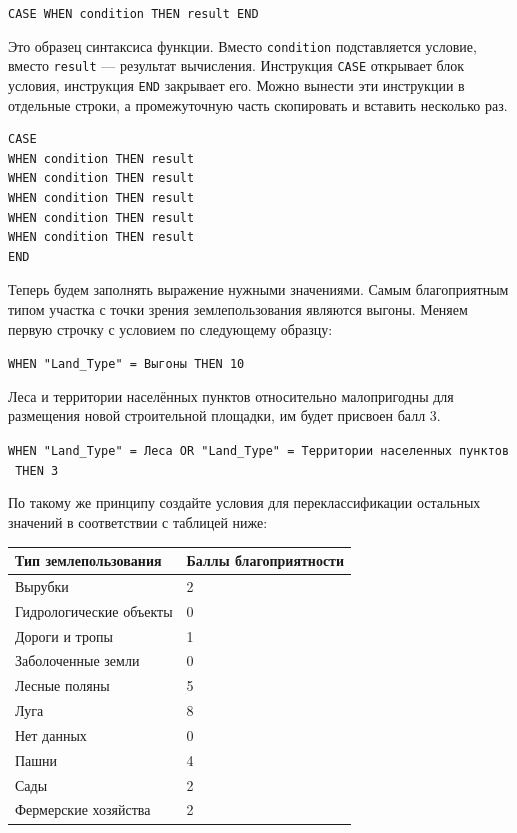 \documentclass[
  12pt,
]{book}
\begin{document}
\begin{enumerate}
  \texttt{CASE\ WHEN\ condition\ THEN\ result\ END}

  Это образец синтаксиса функции. Вместо \texttt{condition} подставляется условие, вместо \texttt{result} --- результат вычисления. Инструкция \texttt{CASE} открывает блок условия, инструкция \texttt{END} закрывает его. Можно вынести эти инструкции в отдельные строки, а промежуточную часть скопировать и вставить несколько раз.

\begin{verbatim}
CASE 
WHEN condition THEN result 
WHEN condition THEN result 
WHEN condition THEN result 
WHEN condition THEN result 
WHEN condition THEN result 
END
\end{verbatim}

  Теперь будем заполнять выражение нужными значениями. Самым благоприятным типом участка с точки зрения землепользования являются выгоны. Меняем первую строчку с условием по следующему образцу:

  \texttt{WHEN\ "Land\_Type"\ =\ \textquotesingle{}Выгоны\textquotesingle{}\ THEN\ 10}

  Леса и территории населённых пунктов относительно малопригодны для размещения новой строительной площадки, им будет присвоен балл 3.

  \texttt{WHEN\ "Land\_Type"\ =\ \textquotesingle{}Леса\textquotesingle{}\ OR\ "Land\_Type"\ =\ \textquotesingle{}Территории\ населенных\ пунктов\textquotesingle{}\ THEN\ 3}

  По такому же принципу создайте условия для переклассификации остальных значений в соответствии с таблицей ниже:

  \begin{longtable}[]{@{}ll@{}}
  \toprule
  Тип землепользования & Баллы благоприятности \\
  \midrule
  \endhead
  Вырубки & 2 \\
  Гидрологические объекты & 0 \\
  Дороги и тропы & 1 \\
  Заболоченные земли & 0 \\
  Лесные поляны & 5 \\
  Луга & 8 \\
  Нет данных & 0 \\
  Пашни & 4 \\
  Сады & 2 \\
  Фермерские хозяйства & 2 \\
  \bottomrule
  \end{longtable}


\end{enumerate}
\end{document}
